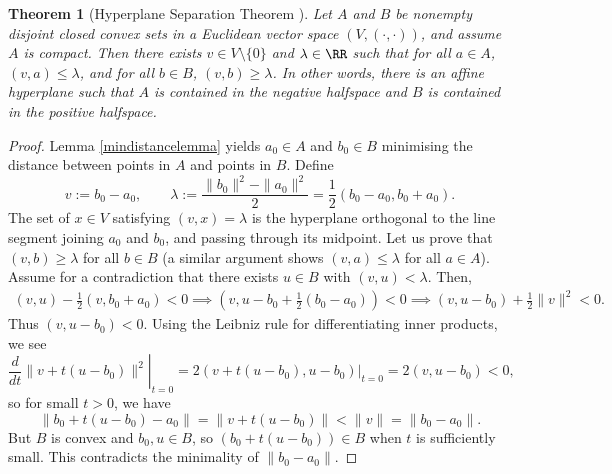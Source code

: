 \documentclass[12pt]{amsart}
\theoremstyle{plain}
\newtheorem{theorem}{Theorem}%
\begin{document}
\begin{theorem}[Hyperplane Separation Theorem {\cite[\S 2.5.1]{BV04}}]\label{hyperplaneseparation}
Let $A$ and $B$ be nonempty disjoint closed convex sets in a Euclidean vector space $(V, (\cdot,\cdot))$, and assume $A$ is compact.
Then there exists $v \in V\setminus\{0\}$ and $\lambda \in \RR$ such that for all $a \in A$, $(v, a) \le \lambda$, and for all $b \in B$, $(v, b) \ge \lambda$.
In other words, there is an affine hyperplane such that $A$ is contained in the negative halfspace and $B$ is contained in the positive halfspace.
\end{theorem}

\begin{proof}
Lemma \ref{mindistancelemma} yields $a_0 \in A$ and $b_0 \in B$ minimising the distance between points in $A$ and points in $B$.
Define
$$v := b_0 - a_0, \qquad \lambda := \frac{\|b_0\|^2 - \|a_0\|^2}{2} = \frac{1}{2}(b_0 - a_0, b_0 + a_0).$$
The set of $x \in V$ satisfying $(v, x) = \lambda$ is the hyperplane orthogonal to the line segment joining $a_0$ and $b_0$, and passing through its midpoint.
Let us prove that $(v, b) \ge \lambda$ for all $b \in B$ (a similar argument shows $(v, a) \le \lambda$ for all $a \in A$).
Assume for a contradiction that there exists $u \in B$ with $(v, u) < \lambda$.
Then,
\begin{align*}
	(v, u) - \frac{1}{2}(v, b_0 + a_0) < 0
							 \implies (v, u - b_0 + \frac{1}{2} (b_0 - a_0)) < 0
							 \implies (v, u - b_0) + \frac{1}{2} \|v\|^2 < 0.
\end{align*}
Thus $(v, u - b_0) < 0$.
Using the Leibniz rule for differentiating inner products, we see
$$\left. \frac{d}{dt} \|v + t(u - b_0)\|^2 \right|_{t=0} = \left. 2 (v + t(u-b_0), u - b_0) \right|_{t=0} = 2 (v, u - b_0) < 0,$$
so for small $t > 0$, we have
$$ \|b_0 + t(u - b_0) - a_0\| = \|v + t(u - b_0)\| < \|v\| = \|b_0 - a_0\|.$$
But $B$ is convex and $b_0, u \in B$, so $(b_0 + t (u - b_0)) \in B$ when $t$ is sufficiently small.
This contradicts the minimality of $\|b_0 - a_0\|$.
\end{proof}
\end{document}
